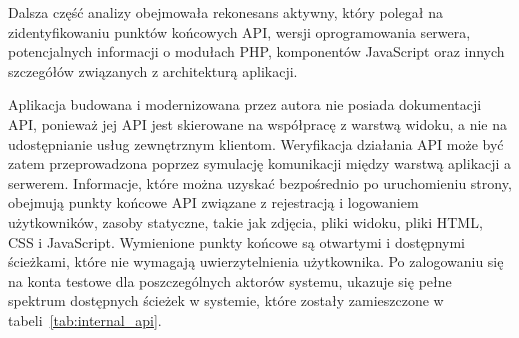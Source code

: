 \documentclass[12pt,oneside]{book}
\begin{document}
    Dalsza część analizy obejmowała rekonesans aktywny, który polegał na zidentyfikowaniu punktów końcowych API, wersji oprogramowania serwera, potencjalnych informacji o modułach PHP, komponentów JavaScript oraz innych szczegółów związanych z architekturą aplikacji.

    Aplikacja budowana i modernizowana przez autora nie posiada dokumentacji API, ponieważ jej API jest skierowane na współpracę z warstwą widoku, a nie na udostępnianie usług zewnętrznym klientom. Weryfikacja działania API może być zatem przeprowadzona poprzez symulację komunikacji między warstwą aplikacji a serwerem. Informacje, które można uzyskać bezpośrednio po uruchomieniu strony, obejmują punkty końcowe API związane z rejestracją i logowaniem użytkowników, zasoby statyczne, takie jak zdjęcia, pliki widoku, pliki HTML, CSS i JavaScript. Wymienione punkty końcowe są otwartymi i dostępnymi ścieżkami, które nie wymagają uwierzytelnienia użytkownika. Po zalogowaniu się na konta testowe dla poszczególnych aktorów systemu, ukazuje się pełne spektrum dostępnych ścieżek w systemie, które zostały zamieszczone w tabeli~\ref{tab:internal_api}.
\end{document}

